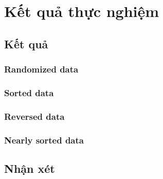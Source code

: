 \section{Kết quả thực nghiệm}

\subsection{Kết quả}

\subsubsection{Randomized data}

\subsubsection{Sorted data}

\subsubsection{Reversed data}

\subsubsection{Nearly sorted data}

\subsection{Nhận xét}